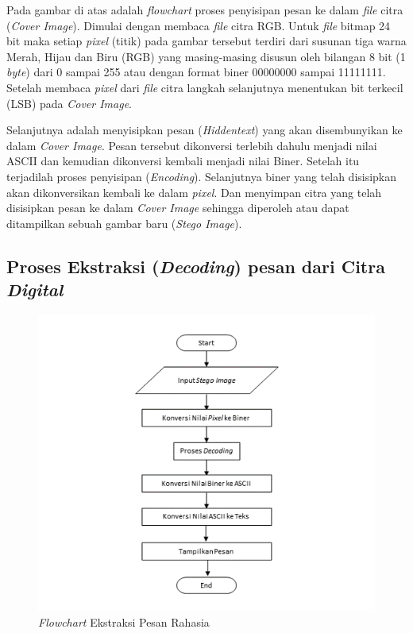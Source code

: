 	Pada gambar di atas adalah \emph{flowchart} proses penyisipan pesan ke dalam \emph{file}
	citra (\emph{Cover Image}). Dimulai dengan membaca \emph{file} citra RGB. Untuk \emph{file} bitmap 24 bit maka setiap \emph{pixel} (titik) pada gambar tersebut terdiri dari susunan
	tiga warna Merah, Hijau dan Biru (RGB) yang masing-masing disusun oleh bilangan 8 bit
	(1 \emph{byte}) dari 0 sampai 255 atau dengan format biner 00000000 sampai 11111111. Setelah
	membaca \emph{pixel} dari \emph{file} citra langkah selanjutnya menentukan bit terkecil (LSB) pada \emph{Cover Image}.
	
	Selanjutnya adalah menyisipkan pesan (\emph{Hiddentext}) yang akan disembunyikan ke dalam \emph{Cover Image}. Pesan tersebut dikonversi terlebih dahulu menjadi nilai ASCII dan kemudian dikonversi kembali menjadi nilai Biner. Setelah itu terjadilah proses penyisipan (\emph{Encoding}). Selanjutnya biner yang telah disisipkan akan dikonversikan kembali ke dalam \emph{pixel}. Dan menyimpan citra yang telah disisipkan pesan ke dalam \emph{Cover Image} sehingga diperoleh atau	dapat ditampilkan sebuah gambar baru (\emph{Stego Image}).
	
	\subsection{Proses Ekstraksi (\emph{Decoding}) pesan dari Citra \emph{Digital}}
	
	\begin{figure}[H]
		\centering
		\includegraphics[width=1\textwidth]{gambar/ekstraksi3}
		\caption{\emph{Flowchart} Ekstraksi Pesan Rahasia}
		\label{flowchart_ekstraksi}
	\end{figure}

